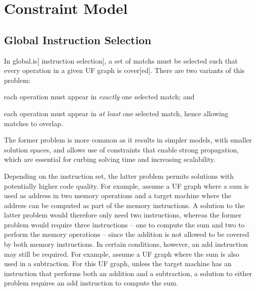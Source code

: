 %

\chapter{Constraint Model}

\section{Global Instruction Selection}

In \gls{global.is}[ \gls{instruction selection}], a set of \glspl{match} must be
selected such that every \gls{operation} in a given \gls{UF graph} is
\gls{cover}[ed].
%
There are two variants of this problem:
%
\begin{enumerateinline}
  \item each \gls{operation} must appear in \emph{exactly} one selected
    \gls{match}; and
%
  \item each \gls{operation} must appear in \emph{at least} one selected
    \gls{match}, hence allowing matches to \gls{overlap}.
\end{enumerateinline}
%
The former problem is more common as it results in simpler models, with smaller
\glspl{solution space}, and allows use of \glspl{constraint} that enable strong
\gls{propagation}, which are essential for curbing solving time and increasing
scalability.

Depending on the \gls{instruction set}, the latter problem permits
\glspl{solution} with potentially higher code quality.
%
For example, assume a \gls{UF graph} where a sum is used as address in two
memory operations and a \gls{target machine} where the address can be computed
as part of the memory instructions.
%
A \gls{solution} to the latter problem would therefore only need two
instructions, whereas the former problem would require three instructions -- one
to compute the sum and two to perform the memory operations -- since the
addition is not allowed to be covered by both memory instructions.
%
In certain conditions, however, an add instruction may still be required.
%
For example, assume a \gls{UF graph} where the sum is also used in a
subtraction.
%
For this \gls{UF graph}, unless the \gls{target machine} has an instruction that
performs both an addition and a subtraction, a \gls{solution} to either problem
requires an add instruction to compute the sum.



